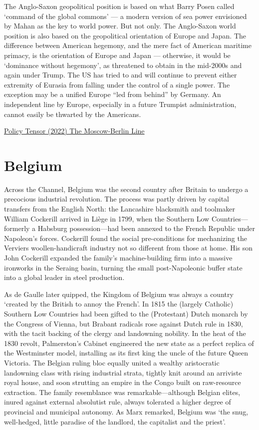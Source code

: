 \documentclass[
]{book}
\begin{document}
The Anglo-Saxon geopolitical position is based on what Barry Posen called `command of the global commons' --- a modern version of sea power envisioned by Mahan as the key to world power. But not only. The Anglo-Saxon world position is also based on the geopolitical orientation of Europe and Japan. The difference between American hegemony, and the mere fact of American maritime primacy, is the orientation of Europe and Japan --- otherwise, it would be `dominance without hegemony', as threatened to obtain in the mid-2000s and again under Trump. The US has tried to and will continue to prevent either extremity of Eurasia from falling under the control of a single power. The exception may be a unified Europe ``led from behind'' by Germany. An independent line by Europe, especially in a future Trumpist administration, cannot easily be thwarted by the Americans.

\href{https://policytensor.substack.com/p/the-moscow-berlin-line}{Policy Tensor (2022) The Moscow-Berlin Line}

\hypertarget{belgium}{%
\chapter{Belgium}\label{belgium}}

Across the Channel, Belgium was the second country after Britain to undergo a precocious industrial revolution. The process was partly driven by capital transfers from the English North: the Lancashire blacksmith and toolmaker William Cockerill arrived in Liège in 1799, when the Southern Low Countries---formerly a Habsburg possession---had been annexed to the French Republic under Napoleon's forces. Cockerill found the social pre-conditions for mechanizing the Verviers woollen-handicraft industry not so different from those at home. His son John Cockerill expanded the family's machine-building firm into a massive ironworks in the Seraing basin, turning the small post-Napoleonic buffer state into a global leader in steel production.

As de Gaulle later quipped, the Kingdom of Belgium was always a country `created by the British to annoy the French'. In 1815 the (largely Catholic) Southern Low Countries had been gifted to the (Protestant) Dutch monarch by the Congress of Vienna, but Brabant radicals rose against Dutch rule in 1830, with the tacit backing of the clergy and landowning nobility. In the heat of the 1830 revolt, Palmerston's Cabinet engineered the new state as a perfect replica of the Westminster model, installing as its first king the uncle of the future Queen Victoria. The Belgian ruling bloc equally united a wealthy aristocratic landowning class with rising industrial strata, tightly knit around an arriviste royal house, and soon strutting an empire in the Congo built on raw-resource extraction. The family resemblance was remarkable---although Belgian elites, inured against external absolutist rule, always tolerated a higher degree of provincial and municipal autonomy. As Marx remarked, Belgium was `the snug, well-hedged, little paradise of the landlord, the capitalist and the priest'.
\end{document}
